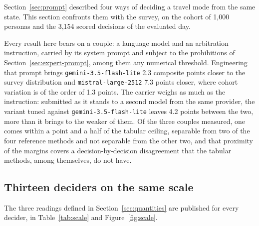 Section~\ref{sec:prompt} described four ways of deciding a travel mode from the same state. This section confronts them with the survey, on the cohort of 1{,}000 personas and the 3{,}154 scored decisions of the evaluated day.

Every result here bears on a couple: a language model and an arbitration instruction, carried by its system prompt and subject to the prohibitions of Section~\ref{sec:expert-prompt}, among them any numerical threshold. Engineering that prompt brings \texttt{gemini-3.5-flash-lite} 2.3 composite points closer to the survey distribution and \texttt{mistral-large-2512} 7.3 points closer, where cohort variation is of the order of 1.3 points. The carrier weighs as much as the instruction: submitted as it stands to a second model from the same provider, the variant tuned against \texttt{gemini-3.5-flash-lite} leaves 4.2 points between the two, more than it brings to the weaker of them. Of the three couples measured, one comes within a point and a half of the tabular ceiling, separable from two of the four reference methods and not separable from the other two, and that proximity of the margins covers a decision-by-decision disagreement that the tabular methods, among themselves, do not have.

\subsection{Thirteen deciders on the same scale}
\label{sec:scale}

The three readings defined in Section~\ref{sec:quantities} are published for every decider, in Table~\ref{tab:scale} and Figure~\ref{fig:scale}.

